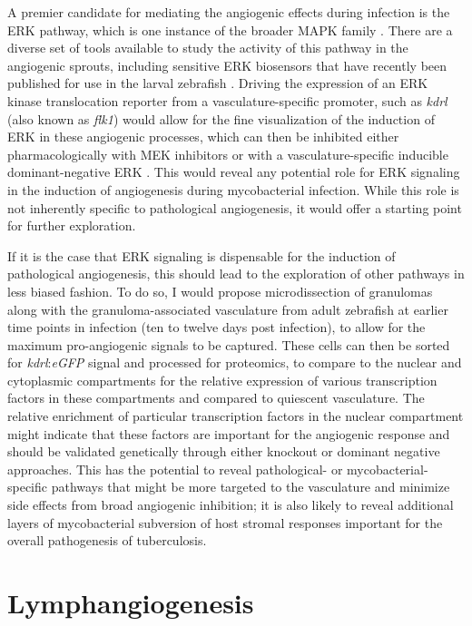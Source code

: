 A premier candidate for mediating the angiogenic effects during infection is the ERK pathway, which is one instance of the broader MAPK family \citep{Shibuya2006, Wang2020b}. There are a diverse set of tools available to study the activity of this pathway in the angiogenic sprouts, including sensitive ERK biosensors that have recently been published for use in the larval zebrafish \citep{DeSimone2021}. Driving the expression of an ERK kinase translocation reporter from a vasculature\hyp{}specific promoter, such as \textit{kdrl} (also known as \textit{flk1}) would allow for the fine visualization of the induction of ERK in these angiogenic processes, which can then be inhibited either pharmacologically with MEK inhibitors or with a vasculature\hyp{}specific inducible dominant\hyp{}negative ERK \citep{Izumi2001}. This would reveal any potential role for ERK signaling in the induction of angiogenesis during mycobacterial infection. While this role is not inherently specific to pathological angiogenesis, it would offer a starting point for further exploration. 

If it is the case that ERK signaling is dispensable for the induction of pathological angiogenesis, this should lead to the exploration of other pathways in less biased fashion. To do so, I would propose microdissection of granulomas along with the granuloma\hyp{}associated vasculature from adult zebrafish at earlier time points in infection (ten to twelve days post infection), to allow for the maximum pro\hyp{}angiogenic signals to be captured. These cells can then be sorted for \textit{kdrl}:\textit{eGFP} signal and processed for proteomics, to compare to the nuclear and cytoplasmic compartments for the relative expression of various transcription factors in these compartments and compared to quiescent vasculature. The relative enrichment of particular transcription factors in the nuclear compartment might indicate that these factors are important for the angiogenic response and should be validated genetically through either knockout or dominant negative approaches. This has the potential to reveal pathological\hyp{} or mycobacterial\hyp{}specific pathways that might be more targeted to the vasculature and minimize side effects from broad angiogenic inhibition; it is also likely to reveal additional layers of mycobacterial subversion of host stromal responses important for the overall pathogenesis of tuberculosis.

\section{Lymphangiogenesis}\label{lymphangiogenesis}

